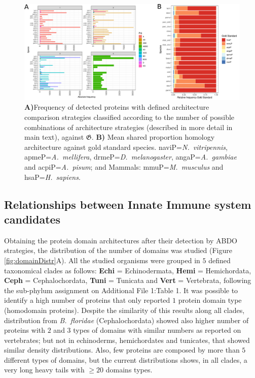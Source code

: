 \documentclass[11pt]{article}
\newcommand{\TODO}[1]{\begingroup\color{red}#1\endgroup}
\begin{document}
\begin{figure}[ht!]
\centering
\includegraphics[scale=0.43]{figures/unitedComparedGOLD}%
\caption{\textbf{A)}Frequency of detected proteins with defined architecture
comparison strategies classified according to the number of possible combinations of 
architecture strategies (described in more detail in main text), 
against $\boldsymbol{\mathfrak{G}}$. \textbf{B)} Mean shared proportion 
homology architecture against gold standard species. \textsf{naviP=}\textit{N.\ 
vitripennis}, \textsf{apmeP=}\textit{A.\ mellifera}, \textsf{drmeP=}\textit{D.\ 
melanogaster}, \textsf{angaP=}\textit{A.\ gambiae} and 
\textsf{acpiP=}\textit{A.\ pisum}; and Mammals: 
\textsf{mmuP=}\textit{M.\ musculus} and \textsf{hsaP=}\textit{H.\ sapiens}.}
\label{fig:FrecEstrat}
\end{figure}


\subsection*{Relationships between Innate Immune system candidates} 
\label{Orthology}

Obtaining the protein domain architectures after their detection by ABDO 
strategies, the distribution of the number of domains was studied (Figure 
\ref{fig:domainDistr}A). All the studied organisms were grouped in $5$ 
defined taxonomical clades as follows: \textbf{Echi} = Echinodermata, 
\textbf{Hemi} = Hemichordata, \textbf{Ceph} = Cephalochordata, \textbf{Tuni} = 
Tunicata and \textbf{Vert} = Vertebrata, following the sub-phylum assignment on 
Additional File 1:Table 1. It was possible to identify a high number of 
proteins that only reported $1$ protein domain type (homodomain proteins).
Despite the similarity of this results along all clades, distribution 
from \textsl{B.\ floridae} (Cephalochordata) showed also higher number of 
proteins with $2$ and $3$ types of domains with similar numbers as reported 
on vertebrates; but not in echinoderms, hemichordates and tunicates, that 
showed similar density distributions. Also, few proteins are composed by more 
than $5$ different types of domains, but the current distributions shows, in 
all clades, a very long heavy tails with \TODO{$\ge 20$ domains types}.
\end{document}
